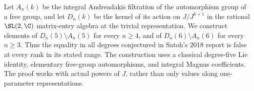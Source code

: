 Let $A_n(k)$ be the integral Andreadakis filtration of the automorphism group
of a free group, and let $D_n(k)$ be the kernel of its action on
$J/J^{k+1}$ in the rational $\SL(2,\C)$ matrix-entry algebra at the trivial
representation. We construct elements of $D_n(5)\setminus A_n(5)$ for every
$n\geq4$, and of $D_n(6)\setminus A_n(6)$ for every $n\geq3$.
Thus the equality in all degrees conjectured in Satoh's 2018 report is false
at every rank in its stated range. The construction uses a classical
degree-five Lie identity, elementary free-group automorphisms, and integral
Magnus coefficients. The proof works with actual powers of $J$, rather than
only values along one-parameter representations.
